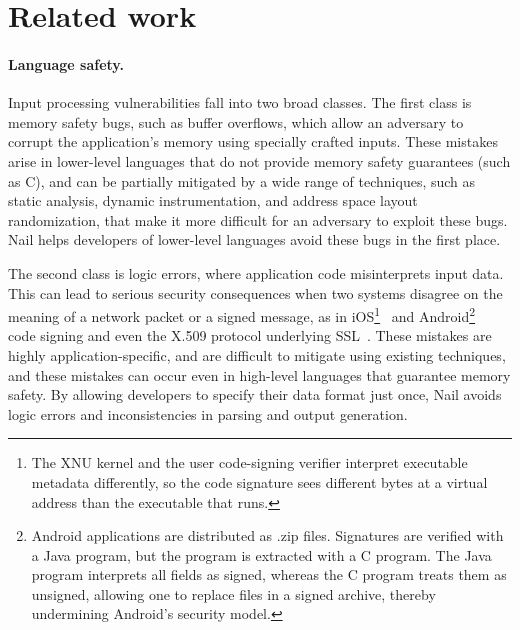 \section{Related work}
\label{s:relwk}


\paragraph{Language safety.}

Input processing vulnerabilities fall into two broad classes.  The first
class is memory safety bugs, such as buffer overflows, which allow an
adversary to corrupt the application's memory using specially crafted
inputs.  These mistakes arise in lower-level languages that do not
provide memory safety guarantees (such as C), and can be partially
mitigated by a wide range of techniques, such as static analysis,
dynamic instrumentation, and address space layout randomization, that
make it more difficult for an adversary to exploit these bugs.
Nail helps developers of lower-level languages avoid these bugs
in the first place.

The second class is logic errors, where application code misinterprets
input data.  This can lead to serious security consequences when two
systems disagree on the meaning of a network packet or a signed message,
as in iOS\footnote{The XNU kernel and the user code-signing verifier
interpret executable metadata differently, so the code signature
sees different bytes at a virtual address than the executable that
runs.}~\cite{evaders6} and Android\footnote{Android applications
are distributed as .zip files. Signatures are verified with a Java
program, but the program is extracted with a C program.  The Java
program interprets all fields as signed, whereas the C program
treats them as unsigned, allowing one to replace files in a signed
archive, thereby undermining Android's security model.}~\cite{saurik-masterkey} code signing and even the X.509 protocol
underlying SSL~\cite{DBLP:conf/fc/KaminskyPS10}.  These mistakes are
highly application-specific, and are difficult to mitigate using existing
techniques, and these mistakes can occur even in high-level languages
that guarantee memory safety.
By allowing developers to specify their data format just once, Nail
avoids logic errors and inconsistencies in parsing and output generation.

